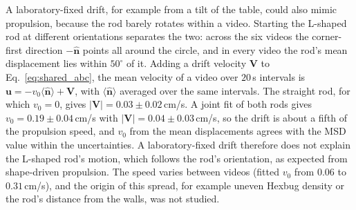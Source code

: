 \documentclass[10pt,twocolumn]{article}
\begin{document}
A laboratory-fixed drift, for example from a tilt of the table, could also mimic propulsion, because the rod barely rotates within a video.
Starting the L-shaped rod at different orientations separates the two: across the six videos the corner-first direction $-\hat{\mathbf n}$ points all around the circle, and in every video the rod's mean displacement lies within $50^\circ$ of it.
Adding a drift velocity $\mathbf V$ to Eq.~\eqref{eq:shared_abc}, the mean velocity of a video over $20\,$s intervals is $\mathbf u=-v_0\langle\hat{\mathbf n}\rangle+\mathbf V$, with $\langle\hat{\mathbf n}\rangle$ averaged over the same intervals.
The straight rod, for which $v_0=0$, gives $|\mathbf V|=0.03\pm0.02\,$cm/s.
A joint fit of both rods gives $v_0=0.19\pm0.04\,$cm/s with $|\mathbf V|=0.04\pm0.03\,$cm/s, so the drift is about a fifth of the propulsion speed, and $v_0$ from the mean displacements agrees with the MSD value within the uncertainties.
A laboratory-fixed drift therefore does not explain the L-shaped rod's motion, which follows the rod's orientation, as expected from shape-driven propulsion.
The speed varies between videos (fitted $v_0$ from $0.06$ to $0.31\,$cm/s), and the origin of this spread, for example uneven Hexbug density or the rod's distance from the walls, was not studied.



\end{document}
